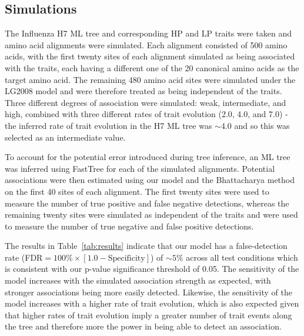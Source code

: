 \documentclass[]{article}
\begin{document}
\subsection*{Simulations}
The Influenza H7 ML tree and corresponding HP and LP traits were taken and amino acid alignments were simulated. Each alignment consisted of 500 amino acids, with the first twenty sites of each alignment simulated as being associated with the traits, each having a different one of the 20 canonical amino acids as the target amino acid. The remaining 480 amino acid sites were simulated under the LG2008 model and were therefore treated as being independent of the traits. Three different degrees of association were simulated: weak, intermediate, and high, combined with three different rates of trait evolution (2.0, 4.0, and 7.0) - the inferred rate of trait evolution in the H7 ML tree was $\sim$4.0 and so this was selected as an intermediate value. 

To account for the potential error introduced during tree inference, an ML tree was inferred using FastTree \citep{price2010fasttree}  for each of the simulated alignments. Potential associations were then estimated using our model and the Bhattacharya method \citep{bhattacharya2007founder} on the first 40 sites of each alignment. The first twenty sites were used to measure the number of true positive and false negative detections, whereas the remaining twenty sites were simulated as independent of the traits and were used to measure the number of true negative and false positive detections. 

The results in Table~\ref{tab:results} indicate that our model has a false-detection rate (FDR$=100\% \times [1.0 - \text{Specificity}]$) of $\sim5\%$ across all test conditions which is consistent with our p-value significance threshold of 0.05. The sensitivity of the model increases with the simulated association strength as expected, with stronger associations being more easily detected. Likewise, the sensitivity of the model increases with a higher rate of trait evolution, which is also expected given that higher rates of trait evolution imply a greater number of trait events along the tree and therefore more the power in being able to detect an association.
\end{document}

